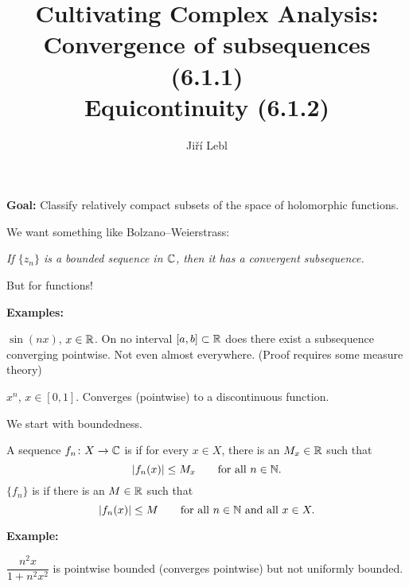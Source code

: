 \documentclass[10pt,aspectratio=169]{beamer}
\author{Ji\v{r}\'i Lebl}
\institute[OSU]{%
Departemento pri Matematiko de Oklahoma {\^S}tata Universitato}
\title{Cultivating Complex Analysis:\\%
Convergence of subsequences (6.1.1)\\%
Equicontinuity (6.1.2)}
\date{}
\begin{document}
\begin{frame}
\titlepage
\end{frame}

\begin{frame}
\textbf{Goal:} Classify relatively compact subsets of the space of holomorphic
functions.

\medskip
\pause

We want something like Bolzano--Weierstrass:

\emph{If $\{ z_n \}$ is a
bounded sequence in ${\mathbb{C}}$, then it has a convergent subsequence.}

\medskip
\pause

But for functions!

\bigskip
\pause

\textbf{Examples:}

\medskip

$\sin(nx)$, \enspace $x \in {\mathbb{R}}$. \pause
On no interval $[a,b] \subset {\mathbb{R}}$ does there exist
a subsequence converging pointwise.  Not even almost everywhere.
\pause
(Proof requires some measure theory)

\medskip
\pause

$x^n$, \enspace $x \in [0,1]$. \pause
Converges (pointwise) to a discontinuous function.

\end{frame}

\begin{frame}
We start with boundedness.

\pause

\begin{definition}
A sequence $f_n \colon X \to {\mathbb{C}}$
is \emph{} if for every $x \in X$, there is an $M_x \in {\mathbb{R}}$
such that
\begin{equation*}
\lvert {f_n(x)} \rvert \leq M_x \qquad \text{for all } n \in {\mathbb{N}} .
\end{equation*}
\pause
$\{ f_n \}$
is \emph{} if there is an $M \in {\mathbb{R}}$
such that
\begin{equation*}
\lvert {f_n(x)} \rvert \leq M \qquad \text{for all } n \in {\mathbb{N}} \text{ and all } x \in X.
\end{equation*}
\end{definition}

\medskip
\pause

\textbf{Example:}

$\dfrac{n^2x}{1+n^2x^2}$ is pointwise bounded (converges pointwise)
but not uniformly bounded.


\end{frame}
\end{document}
